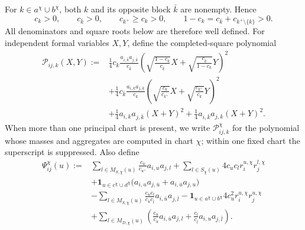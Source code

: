 \documentclass[11pt]{article}
\begin{document}
For $k\in a^\chi\cup b^\chi$, both $k$ and its opposite block $\bar k$
are nonempty.  Hence
\[
c_k>0,\qquad c_{\bar k}>0,\qquad c_{k^+}\ge c_k>0,
\qquad
1-c_k=c_{\bar k}+c_{k^+\setminus\{k\}}>0.
\]
All denominators and square roots below are therefore well defined.  For
independent formal variables $X,Y$, define the completed-square polynomial
\begin{equation}\label{eq:P-package}
\begin{aligned}
\mathcal P_{ij,k}(X,Y):={}&\frac14c_k
 \frac{a_{i,\bar k}a_{j,\bar k}}{c_{\bar k}}
 \left(\sqrt{\frac{1-c_k}{c_{\bar k}}}X
      +\sqrt{\frac{c_{\bar k}}{1-c_k}}Y\right)^2\\
&+\frac14c_{\bar k}\frac{a_{i,k}a_{j,k}}{c_k}
 \left(\sqrt{\frac{c_k}{c_{k^+}}}X
      +\sqrt{\frac{c_{k^+}}{c_k}}Y\right)^2\\
&+\frac14a_{i,k}a_{j,\bar k}(X+Y)^2
 +\frac14a_{i,\bar k}a_{j,k}(X+Y)^2.
\end{aligned}
\end{equation}
When more than one principal chart is present, we write
$\mathcal P_{ij,k}^{\chi}$ for the polynomial whose masses and aggregates are
computed in chart $\chi$; within one fixed chart the superscript is suppressed.
Also define
\begin{equation}\label{eq:Psi-exact}
\begin{aligned}
\Psi_{ij}^{\chi}(u):={}&
\sum_{l\in M_{S,\chi}(u)}
 \frac{c_{\bar u}}{c_{u^+}}a_{i,u}a_{j,l}
+\sum_{l\in S_\chi(u)}4c_uc_l r_i^{u,\chi}r_j^{l,\chi}\\
&+\mathbf1_{u\in c^\chi\cup d^\chi}
 \bigl(a_{i,u}a_{j,\bar u}+a_{i,\bar u}a_{j,u}\bigr)\\
&-\sum_{l\in M_{S,\chi}(u)}
 \frac{c_uc_l}{c_{\bar u}c_{\bar l}}
 a_{i,\bar u}a_{j,\bar l}
-\mathbf1_{u\in a^\chi\cup b^\chi}
 4c_u^2r_i^{u,\chi}r_j^{u,\chi}\\
&+\sum_{l\in M_{D,\chi}(u)}
 \left(
 \frac{c_u}{c_{\bar u}}a_{i,\bar u}a_{j,l}
 +\frac{c_l}{c_{\bar l}}a_{i,u}a_{j,\bar l}
 \right).
\end{aligned}
\tag{A.30a}
\end{equation}
\end{document}
